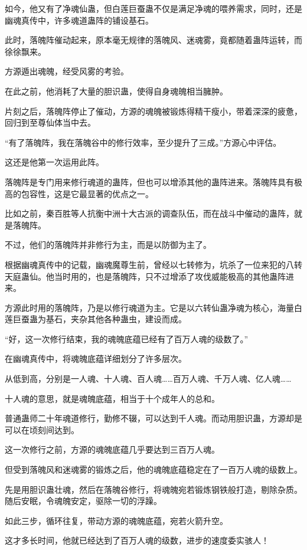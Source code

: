 \begin{this_body}
如今，他又有了净魂仙蛊，但白莲巨蚕蛊不仅是满足净魂的喂养需求，同时，还是幽魂真传中，许多魂道蛊阵的铺设基石。

此时，落魄阵催动起来，原本毫无规律的落魄风、迷魂雾，竟都随着蛊阵运转，而徐徐飘来。

方源遁出魂魄，经受风雾的考验。

在此之前，他消耗了大量的胆识蛊，使得自身魂魄相当臃肿。

片刻之后，落魄阵停止了催动，方源的魂魄被锻炼得精干瘦小，带着深深的疲惫，回归到至尊仙体当中去。

“有了落魄阵，我在落魄谷中的修行效率，至少提升了三成。”方源心中评估。

这还是他第一次运用此阵。

落魄阵是专门用来修行魂道的蛊阵，但也可以增添其他的蛊阵进来。落魄阵具有极高的包容性，这是它最显著的优点之一。

比如之前，秦百胜等人抗衡中洲十大古派的调查队伍，而在战斗中催动的蛊阵，就是落魄阵。

不过，他们的落魄阵并非修行为主，而是以防御为主了。

根据幽魂真传中的记载，幽魂魔尊生前，曾经以七转修为，坑杀了一位来犯的八转天庭蛊仙。他当时用的，也是落魄阵，只不过增添了攻伐威能极高的其他蛊阵进来。

方源此时用的落魄阵，乃是以修行魂道为主。它是以六转仙蛊净魂为核心，海量白莲巨蚕蛊为基石，夹杂其他各种蛊虫，建设而成。

“好，这一次修行结束，我的魂魄底蕴已经有了百万人魂的级数了。”

在幽魂真传中，将魂魄底蕴详细划分了许多层次。

从低到高，分别是一人魂、十人魂、百人魂……百万人魂、千万人魂、亿人魂……

十人魂的意思，就是魂魄底蕴，相当于十个成年人的总和。

普通蛊师二十年魂道修行，勤修不辍，可以达到千人魂。而动用胆识蛊，方源却是可以在顷刻间达到。

这一次修行之前，方源的魂魄底蕴几乎要达到三百万人魂。

但受到落魄风和迷魂雾的锻炼之后，他的魂魄底蕴稳定在了一百万人魂的级数上。

先是用胆识蛊壮魂，然后在落魄谷修行，将魂魄宛若锻炼钢铁般打造，剔除杂质。随后安眠，令魂魄安定，驱除一切的浮躁。

如此三步，循环往复，带动方源的魂魄底蕴，宛若火箭升空。

这才多长时间，他就已经达到了百万人魂的级数，进步的速度委实骇人！


\end{this_body}
